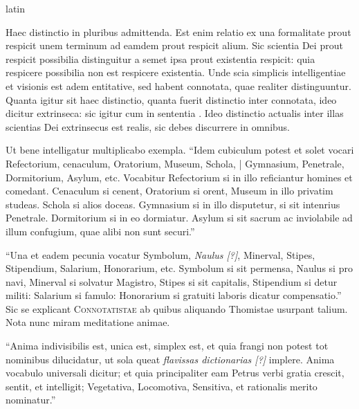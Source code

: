 \begin{otherlanguage*}{latin}
\pstart
{}
\pend

\pstart
Haec distinctio in pluribus admittenda. Est enim relatio ex una formalitate prout respicit unem terminum ad eamdem prout respicit alium. Sic scientia Dei prout respicit possibilia distinguitur a semet ipsa prout existentia respicit:
quia respicere possibilia non est respicere existentia. Unde scia simplicis intelligentiae et visionis est adem entitative, sed habent connotata, quae realiter distinguuntur. Quanta igitur sit haec distinctio, quanta fuerit distinctio inter connotata, ideo dicitur extrinseca:
sic igitur cum in sententia . Ideo distinctio actualis inter illas scientias Dei extrinsecus est realis, sic debes discurrere in omnibus. 
\pend

\pstart
Ut bene intelligatur multiplicabo exempla. \enquote{Idem cubiculum potest et solet vocari Refectorium, cenaculum, Oratorium, Museum, Schola, \textnormal{|} Gymnasium, Penetrale, Dormitorium, Asylum, etc. Vocabitur Refectorium si in illo reficiantur homines et comedant. Cenaculum si cenent, Οratorium si orent, Museum in illo privatim studeas. Schola si alios doceas. Gymnasium si in illo disputetur, si sit intenrius Penetrale. Dormitorium si in eo dormiatur. Asylum si sit sacrum ac inviolabile ad illum confugium, quae alibi non sunt securi.} 
\pend

\pstart
\enquote{Una et eadem pecunia vocatur Symbolum, \emph{Naulus [?]}, Minerval, Stipes, Stipendium, Salarium, Honorarium, etc. Symbolum si sit permensa, Naulus si pro navi, Minerval si solvatur Magistro, Stipes si sit capitalis, Stipendium si detur militi:
Salarium si famulo:
Honorarium si gratuiti laboris dicatur compensatio.} Sic se explicant \textsc{Connotatistae}\index[persons]{} ab quibus aliquando Thomistae usurpant talium. Nota nunc miram meditatione animae. 
\pend

\pstart
\enquote{Anima indivisibilis est, unica est, simplex est, et quia frangi non potest tot nominibus dilucidatur, ut sola queat \emph{flavissas dictionarias [?]} implere. Anima vocabulo universali dicitur; et quia principaliter eam Petrus verbi gratia crescit, sentit, et intelligit; Vegetativa, Locomotiva, Sensitiva, et rationalis merito nominatur.} 
\pend


\end{otherlanguage*}
